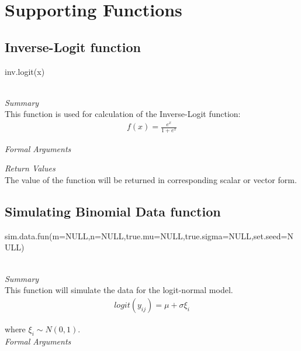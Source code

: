 \documentclass[11pt]{article}\usepackage[]{graphicx}\usepackage[]{color}
\begin{document}
\newpage\section{Supporting Functions}

\subsection{Inverse-Logit function}

\begin{verb}
inv.logit(x)
\end{verb}\\

\emph{Summary}\\

This function is used for calculation of the Inverse-Logit function:
\begin{align*}
f(x)=\frac{e^x}{1+e^x}
\end{align*}

\emph{Formal Arguments}


\emph{Return Values}\\

The value of the function will be returned in corresponding scalar or vector form.\\

\subsection{Simulating Binomial Data function}

\begin{verb}
sim.data.fun(m=NULL,n=NULL,true.mu=NULL,true.sigma=NULL,set.seed=NULL)
\end{verb}\\

\emph{Summary}\\

This function will simulate the data for the logit-normal model.
\begin{align*}
logit(y_{ij})=\mu+\sigma\xi_i
\end{align*}

where $\xi_i\sim N(0,1)$.\\

\emph{Formal Arguments}
\end{document}
